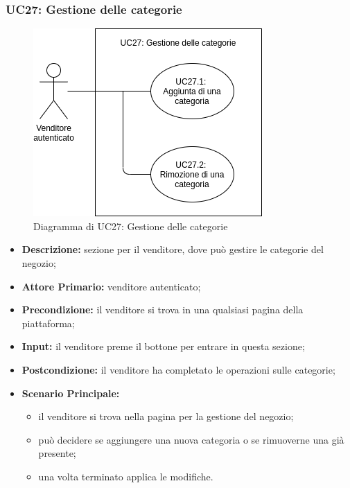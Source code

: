 \subsubsection{UC27: Gestione delle categorie}
\label{sec:UC27}
\begin{figure}[!ht]
    \caption{Diagramma di UC27: Gestione delle categorie}
    \vspace{10px}
    \includegraphics[scale=0.5]{../../../Images/AnalisiRequisiti/UC27}
    \centering
\end{figure}
\begin{itemize}
    \item \textbf{Descrizione:} sezione per il venditore, dove può gestire le categorie del negozio;
    \item \textbf{Attore Primario:} venditore autenticato;
    \item \textbf{Precondizione:} il venditore si trova in una qualsiasi pagina della piattaforma;
    \item \textbf{Input:} il venditore preme il bottone per entrare in questa sezione;
    \item \textbf{Postcondizione:} il venditore ha completato le operazioni sulle categorie;
    \item \textbf{Scenario Principale:}
          \begin{itemize}
              \item il venditore si trova nella pagina per la gestione del negozio;
              \item può decidere se aggiungere una nuova categoria o se rimuoverne una già presente;
              \item una volta terminato applica le modifiche.
          \end{itemize}
\end{itemize}
